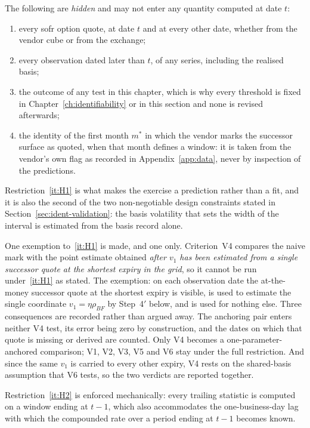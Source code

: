 \documentclass[../../../main.tex]{subfiles}
\begin{document}
The following are \emph{hidden} and may not enter any quantity computed at date $t$:
\begin{enumerate}[nosep,label=(H\arabic*)]
\item\label{it:H1} every \gls{sofr} option quote, at date $t$ and at every other date, whether from the vendor cube or from the exchange;
\item\label{it:H2} every observation dated later than $t$, of any series, including the realised basis;
\item\label{it:H3} the outcome of any test in this chapter, which is why every threshold is fixed in Chapter~\ref{ch:identifiability} or in this section and none is revised afterwards;
\item\label{it:H4} the identity of the first month $m^*$ in which the vendor marks the successor surface as quoted, when that month defines a window: it is taken from the vendor's own flag as recorded in Appendix~\ref{app:data}, never by inspection of the predictions.
\end{enumerate}

Restriction~\ref{it:H1} is what makes the exercise a prediction rather than a fit, and it is also the second of the two non-negotiable design constraints stated in Section~\ref{sec:ident-validation}: the basis volatility that sets the width of the interval is estimated from the basis record alone.

One exemption to~\ref{it:H1} is made, and one only. Criterion~V4 compares the naive mark with the point estimate obtained \emph{after $v_1$ has been estimated from a single successor quote at the shortest expiry in the grid}, so it cannot be run under~\ref{it:H1} as stated. The exemption: on each observation date the at-the-money successor quote at the shortest expiry is visible, is used to estimate the single coordinate $v_1=\eta\rho_{BF}$ by Step~4$'$ below, and is used for nothing else. Three consequences are recorded rather than argued away. The anchoring pair enters neither V4 test, its error being zero by construction, and the dates on which that quote is missing or derived are counted. Only V4 becomes a one-parameter-anchored comparison; V1, V2, V3, V5 and V6 stay under the full restriction. And since the same $v_1$ is carried to every other expiry, V4 rests on the shared-basis assumption that V6 tests, so the two verdicts are reported together.

Restriction~\ref{it:H2} is enforced mechanically: every trailing statistic is computed on a window ending at $t-1$, which also accommodates the one-business-day lag with which the compounded rate over a period ending at $t-1$ becomes known.
\end{document}
